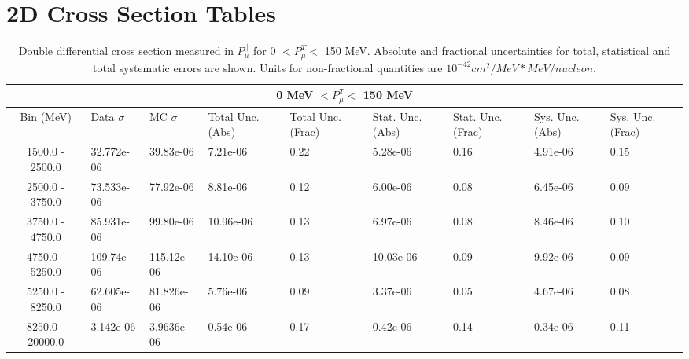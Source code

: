 \chapter{2D Cross Section Tables}
\label{Ap:XsecTables2D}


\begin{table}[!htb]
    \centering
    \tiny
    \begin{tabular}{|c|p{0.5in}|p{0.5in}|p{0.5in}|p{0.5in}|p{0.5in}|p{0.5in}|p{0.5in}|p{0.5in}|}

        \hline
        \multicolumn{9}{c}{0 MeV $ < P^T_\mu < $ 150 MeV}\\
        \hline
        Bin (MeV)& Data $\sigma$ & MC $\sigma$ & Total Unc. (Abs) & Total Unc. (Frac)  & Stat. Unc. (Abs) & Stat. Unc. (Frac) & Sys. Unc. (Abs) & Sys. Unc. (Frac)\\ \hline
1500.0 - 2500.0 & 32.772e-06 & 39.83e-06 & 7.21e-06 & 0.22 & 5.28e-06 & 0.16 & 4.91e-06 & 0.15\\ \hline
2500.0 - 3750.0 & 73.533e-06 & 77.92e-06 & 8.81e-06 & 0.12 & 6.00e-06 & 0.08 & 6.45e-06 & 0.09\\ \hline
3750.0 - 4750.0 & 85.931e-06 & 99.80e-06 & 10.96e-06 & 0.13 & 6.97e-06 & 0.08 & 8.46e-06 & 0.10\\ \hline
4750.0 - 5250.0 & 109.74e-06 & 115.12e-06 & 14.10e-06 & 0.13 & 10.03e-06 & 0.09 & 9.92e-06 & 0.09\\ \hline
5250.0 - 8250.0 & 62.605e-06 & 81.826e-06 & 5.76e-06 & 0.09 & 3.37e-06 & 0.05 & 4.67e-06 & 0.08\\ \hline
8250.0 - 20000.0 & 3.142e-06 & 3.9636e-06 & 0.54e-06 & 0.17 & 0.42e-06 & 0.14 & 0.34e-06 & 0.11\\ \hline
    \end{tabular}
    \caption{Double differential cross section measured in $P^{||}_\mu$ for 0 $ < P^T_\mu < $ 150 MeV. Absolute and fractional uncertainties for total, statistical and total systematic errors are shown. Units for non-fractional quantities are $10^{-42}cm^2/MeV*MeV/nucleon$. }
    \label{tab:ApdxA:XSecTable2Dpzmuptmu1}
\end{table}

